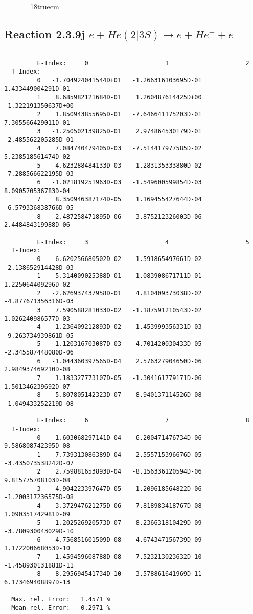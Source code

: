 \begin{figure} \label{2.3.9i}
\epsfxsize=18truecm
\end{figure}
\newpage

\subsection{
Reaction 2.3.9j  $e + He(2|3S) \rightarrow e + He^+ + e $
}



\begin{verbatim}

         E-Index:     0                     1                     2
  T-Index:
         0   -1.704924041544D+01   -1.266316103695D-01    1.433449004291D-01
         1    8.685982121684D-01    1.260487614425D+00   -1.322191350637D+00
         2    1.850943855695D-01   -7.646641175203D-01    7.305566429011D-01
         3   -1.250502139825D-01    2.974864530179D-01   -2.485562205285D-01
         4    7.084740479405D-03   -7.514417977585D-02    5.238518561474D-02
         5    4.623288484133D-03    1.283135333880D-02   -7.288566622195D-03
         6   -1.021819251963D-03   -1.549600599854D-03    8.090570536783D-04
         7    8.350946387174D-05    1.169455427644D-04   -6.579336838766D-05
         8   -2.487258471895D-06   -3.875212326003D-06    2.448484319988D-06

         E-Index:     3                     4                     5
  T-Index:
         0   -6.620256680502D-02    1.591865497661D-02   -2.138652914428D-03
         1    5.314009025388D-01   -1.083908671711D-01    1.225064409296D-02
         2   -2.626937437958D-01    4.810409373038D-02   -4.877671356316D-03
         3    7.590588281033D-02   -1.187591210543D-02    1.026240986577D-03
         4   -1.236409212893D-02    1.453999356331D-03   -9.263734939861D-05
         5    1.120316703087D-03   -4.701420030433D-05   -2.345587448080D-06
         6   -1.044360397565D-04    2.576327904650D-06    2.984937469210D-08
         7    1.183327773107D-05   -1.304161779171D-06    1.501346239692D-07
         8   -5.807805142323D-07    8.940137114526D-08   -1.049433252219D-08

         E-Index:     6                     7                     8
  T-Index:
         0    1.603068297141D-04   -6.200471476734D-06    9.586808742395D-08
         1   -7.739313086389D-04    2.555715396676D-05   -3.435073538242D-07
         2    2.759881653893D-04   -8.156336120594D-06    9.815775708103D-08
         3   -4.904223397647D-05    1.209618564822D-06   -1.200317236575D-08
         4    3.372947621275D-06   -7.818983418767D-08    1.090351742981D-09
         5    1.202526920573D-07    8.236631810429D-09   -3.780930043029D-10
         6    4.756851601509D-08   -4.674347156739D-09    1.172200668053D-10
         7   -1.459459608788D-08    7.523213023632D-10   -1.458930131881D-11
         8    8.295694541734D-10   -3.578861641969D-11    6.173469408897D-13

  Max. rel. Error:   1.4571 %
  Mean rel. Error:   0.2971 %


\end{verbatim}
